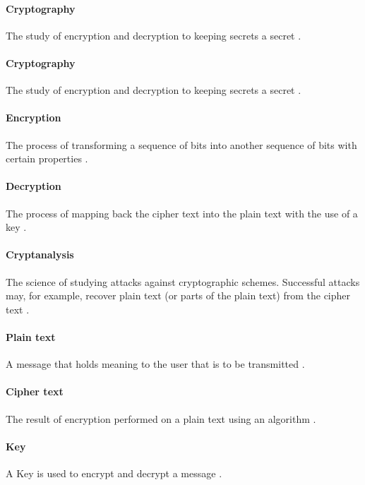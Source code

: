 \documentclass[11pt,a4paper]{report}
\begin{document}
\paragraph{Cryptography}
The study of encryption and decryption to keeping secrets a secret \cite{DBLP:series/isc/DelfsK07}.

\paragraph{Cryptography}
The study of encryption and decryption to keeping secrets a secret \cite{DBLP:series/isc/DelfsK07}.

\paragraph{Encryption}
The process of transforming a sequence of bits into another sequence of bits with certain properties \cite{Fabio2000LogicalSAT}.

\paragraph{Decryption}
The process of mapping back the cipher text into the plain text with the use of a key \cite{Fabio2000LogicalSAT}.

\paragraph{Cryptanalysis}
The science of studying attacks against cryptographic schemes. Successful attacks may, for example, recover plain text (or parts of the plain text) from the cipher text \cite{DBLP:books/sp/Buchmann02}.

\paragraph{Plain text}
A message that holds meaning to the user that is to be transmitted \cite{DBLP:books/sp/Buchmann02}.

\paragraph{Cipher text}
The result of encryption performed on a plain text using an algorithm \cite{Berti2003CISSP}.

\paragraph{Key}
A Key is used to encrypt and decrypt a message \cite{Berti2003CISSP}.
\end{document}
